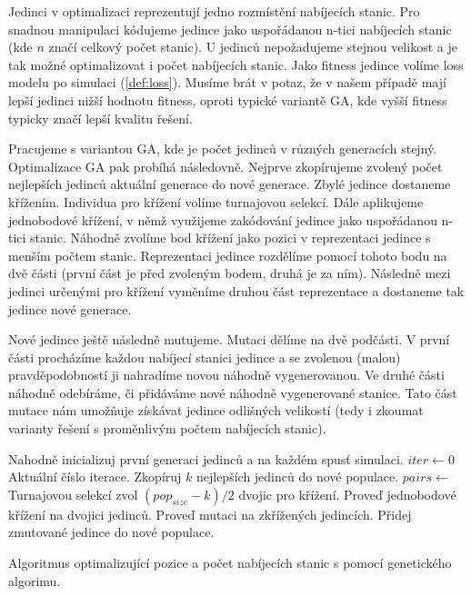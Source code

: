 Jedinci v optimalizaci reprezentují jedno rozmístění nabíjecích stanic.
Pro snadnou manipulaci kódujeme jedince jako uspořádanou n-tici nabíjecích
stanic (kde $n$ značí celkový počet stanic). U jedinců nepožadujeme stejnou 
velikost a je tak možné optimalizovat i počet nabíjecích stanic.
Jako fitness jedince volíme loss modelu po simulaci (\cref{def:loss}).
Musíme brát v potaz, že v našem případě mají lepší jedinci nižší hodnotu fitness,
oproti typické variantě GA, kde vyšší fitness typicky značí lepší kvalitu řešení.

Pracujeme s variantou GA, kde je počet jedinců v různých generacích stejný.
Optimalizace GA pak probíhá následovně. Nejprve zkopírujeme zvolený počet nejlepších
jedinců aktuální generace do nové generace. Zbylé jedince dostaneme křížením.
Individua pro křížení volíme turnajovou selekcí. Dále aplikujeme jednobodové křížení,
v němž využijeme zakódování jedince jako uspořádanou n-tici stanic.
Náhodně zvolíme bod křížení jako pozici v reprezentaci jedince s 
menším počtem stanic. Reprezentaci jedince rozdělíme pomocí tohoto bodu na dvě části 
(první část je před zvoleným bodem, druhá je za ním).
Následně mezi jedinci určenými pro křížení vyměníme druhou část reprezentace a
dostaneme tak jedince nové generace. 

Nové jedince ještě následně mutujeme. Mutaci dělíme na dvě podčásti.
V první části procházíme každou nabíjecí stanici jedince a se zvolenou (malou)
pravděpodobností ji nahradíme novou náhodně vygenerovanou. 
Ve druhé části náhodně odebíráme, či přidáváme nové náhodně vygenerované stanice.
Tato část mutace nám umožňuje získávat jedince odlišných velikostí 
(tedy i zkoumat varianty řešení s proměnlivým počtem nabíjecích stanic).


\begin{algorithm}
\begin{algorithmic}
    \State Nahodně inicializuj první generaci jedinců a na každém spusť simulaci.
    \State $iter \gets 0$   \Comment Aktuální číslo iterace.
        \State Zkopíruj $k$ nejlepších jedinců do nové populace.
        \State $pairs \gets$ Turnajovou selekcí zvol $(pop_{size} - k) / 2$ dvojic pro křížení.
            \State Proveď jednobodové křížení na dvojici jedinců.
            \State Proveď mutaci na zkřížených jedincích.
            \State Přidej zmutované jedince do nové populace.
        \EndFor
    \EndWhile
\EndFunction
\end{algorithmic}
\caption{Algoritmus optimalizující pozice a počet nabíjecích stanic s pomocí genetického algorimu.}
\label{alg:genetic}
\end{algorithm}


